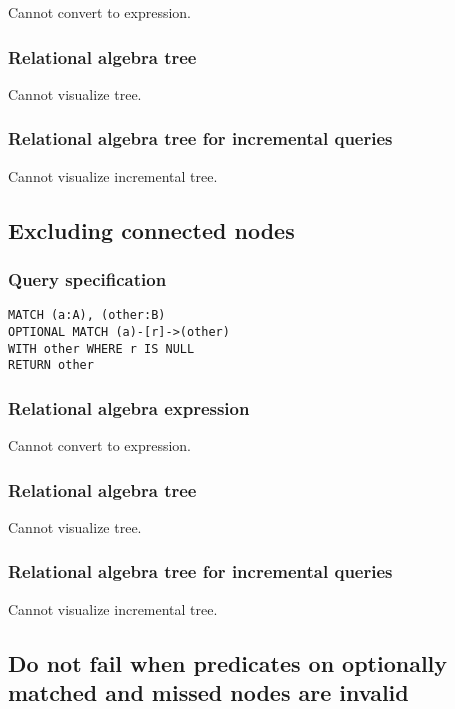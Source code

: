 Cannot convert to expression.

\subsubsection*{Relational algebra tree}

Cannot visualize tree.

\subsubsection*{Relational algebra tree for incremental queries}

Cannot visualize incremental tree.

\subsection{Excluding connected nodes}

\subsubsection*{Query specification}

\begin{lstlisting}
MATCH (a:A), (other:B)
OPTIONAL MATCH (a)-[r]->(other)
WITH other WHERE r IS NULL
RETURN other
\end{lstlisting}

\subsubsection*{Relational algebra expression}

Cannot convert to expression.

\subsubsection*{Relational algebra tree}

Cannot visualize tree.

\subsubsection*{Relational algebra tree for incremental queries}

Cannot visualize incremental tree.

\subsection{Do not fail when predicates on optionally matched and missed nodes are invalid}

